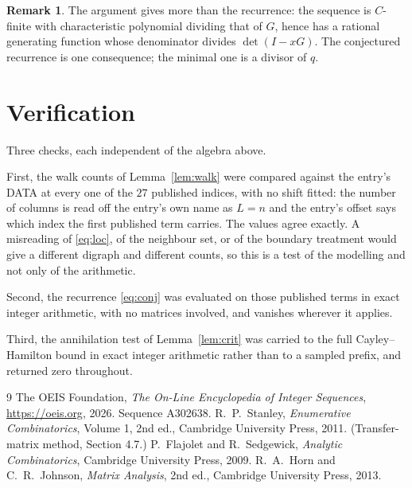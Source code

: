 \documentclass[11pt,a4paper]{article}
\theoremstyle{plain}
\theoremstyle{definition}
\newtheorem{remark}[theorem]{Remark}
\begin{document}
\begin{remark}
The argument gives more than the recurrence: the sequence is $C$-finite with characteristic
polynomial dividing that of $G$, hence has a rational generating function whose denominator
divides $\det(I-xG)$. The conjectured recurrence is one consequence; the minimal one is a
divisor of $q$.
\end{remark}

\section{Verification}

Three checks, each independent of the algebra above.

First, the walk counts of Lemma~\ref{lem:walk} were compared against the entry's DATA at
every one of the $27$ published indices, with no shift fitted: the number of columns is
read off the entry's own name as $L=n$ and the entry's offset says which index the first
published term carries. The values agree exactly. A misreading of \eqref{eq:loc}, of the
neighbour set, or of the boundary treatment would give a different digraph and different
counts, so this is a test of the modelling and not only of the arithmetic.

Second, the recurrence \eqref{eq:conj} was evaluated on those published terms in exact
integer arithmetic, with no matrices involved, and vanishes wherever it applies.

Third, the annihilation test of Lemma~\ref{lem:crit} was carried to the full
Cayley--Hamilton bound in exact integer arithmetic rather than to a sampled prefix, and
returned zero throughout.

\begin{thebibliography}{9}
 The OEIS Foundation, \emph{The On-Line Encyclopedia of Integer
Sequences}, \url{https://oeis.org}, 2026. Sequence A302638.
 R.~P.~Stanley, \emph{Enumerative Combinatorics}, Volume 1, 2nd ed.,
Cambridge University Press, 2011. (Transfer-matrix method, Section 4.7.)
 P.~Flajolet and R.~Sedgewick, \emph{Analytic Combinatorics}, Cambridge
University Press, 2009.
 R.~A.~Horn and C.~R.~Johnson, \emph{Matrix Analysis}, 2nd ed., Cambridge
University Press, 2013.
\end{thebibliography}
\end{document}

